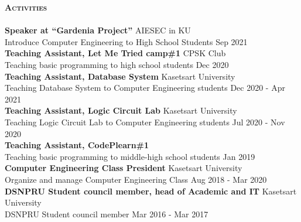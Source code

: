 \documentclass[a4paper]{article}
\newcommand{\lineunder} {
    \vspace*{-8pt} \\
    \hspace*{-18pt} \hrulefill \\
}
\newcommand{\header} [1] {
    {\hspace*{-18pt}\vspace*{6pt} \textsc{\textbf{#1}}}
    \vspace*{-6pt} \lineunder
}
\begin{document}
\header{Activities}
\textbf{Speaker at “Gardenia Project”} \hfill AIESEC in KU\\
Introduce Computer Engineering to High School Students \hfill Sep 2021\\
\vspace*{2mm}
\textbf{Teaching Assistant, Let Me Tried camp\#1} \hfill CPSK Club\\
Teaching basic programming to high school students \hfill Dec 2020\\
\vspace*{2mm}
\textbf{Teaching Assistant, Database System} \hfill Kasetsart University\\
Teaching Database System to Computer Engineering students \hfill Dec 2020 - Apr 2021\\
\vspace*{2mm}
\textbf{Teaching Assistant, Logic Circuit Lab} \hfill Kasetsart University\\
Teaching Logic Circuit Lab to Computer Engineering students \hfill Jul 2020 - Nov 2020\\
\vspace*{2mm}
\textbf{Teaching Assistant, CodePlearn\#1}\\
Teaching basic programming to middle-high school students \hfill Jan 2019\\
\vspace*{2mm}
\textbf{Computer Engineering Class President} \hfill Kasetsart University\\
Organize and manage Computer Engineering Class \hfill Aug 2018 - Mar 2020\\
\vspace*{2mm}
\textbf{DSNPRU Student council member, head of Academic and IT} \hfill Kasetsart University\\
DSNPRU Student council member \hfill Mar 2016 - Mar 2017\\
\vspace*{2mm}


\ 
\end{document}
